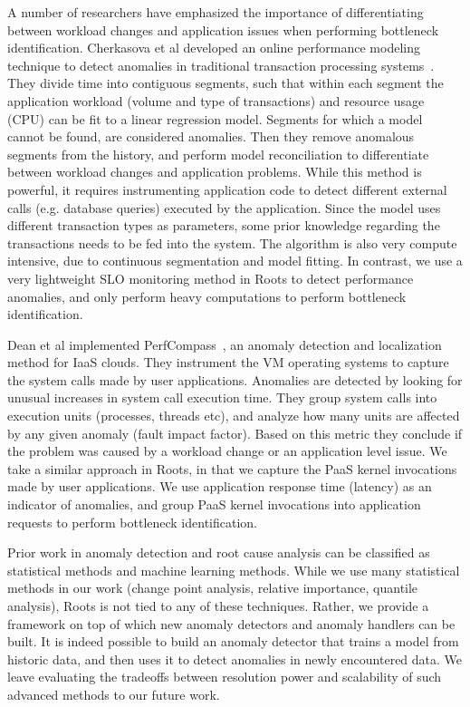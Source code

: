A number of researchers have emphasized the importance of differentiating between workload changes and
application issues when performing bottleneck identification. Cherkasova et al developed an online
performance modeling technique to detect anomalies in traditional transaction processing systems~\cite{4630116}. 
They divide time into contiguous segments, such that within each
segment the application workload (volume and type of transactions) and resource usage (CPU) can be 
fit to a linear regression model.
Segments for which a model cannot be found, are considered anomalies. Then they remove anomalous segments
from the history, and perform model reconciliation to differentiate between workload changes and application problems. 
While this method is powerful, it
requires instrumenting application code to detect different external calls (e.g. database queries) executed by the application. 
Since the model uses different transaction types as parameters, 
some prior knowledge regarding the transactions needs to be fed into the system. 
The algorithm is also very compute intensive, due to continuous segmentation and model fitting.
In contrast, we use a very lightweight SLO monitoring method in Roots to detect performance anomalies, and
only perform heavy computations to perform bottleneck identification. 

Dean et al implemented PerfCompass~\cite{Dean:2014:PTR:2696535.2696551}, 
an anomaly detection and localization method for IaaS clouds. They instrument
the VM operating systems to capture the system calls made by user applications. Anomalies are detected by
looking for unusual increases in system call execution time. They group system calls into execution units
(processes, threads etc), and analyze how many units are affected by any given anomaly (fault impact factor). 
Based on this metric they conclude if the problem was caused by a workload change or an application
level issue. We take a similar approach in Roots, in that we capture the PaaS kernel invocations
made by user applications. We use application response time (latency) as an indicator of anomalies,
and group PaaS kernel invocations into application requests to perform bottleneck identification.

Prior work in anomaly detection and root cause analysis can be classified as statistical
methods and machine learning methods. While we use many statistical methods
in our work (change point analysis, relative importance, quantile analysis), Roots is not tied to any of these
techniques. Rather, we provide a framework on top of which new anomaly detectors and anomaly
handlers can be built. It is indeed possible to build an anomaly detector that trains a model
from historic data, and then uses it to detect anomalies in newly encountered data. We
leave evaluating the tradeoffs between resolution power and scalability of such advanced
methods to our future work.
